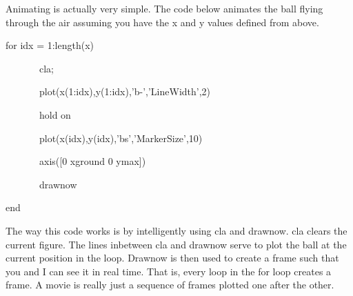 \begin{enumerate}
Animating is actually very simple. The code below animates the ball
flying through the air assuming you have the x and y values defined
from above.

\begin{framed}

for idx = 1:length(x)

~~~~~~~cla;

~~~~~~~plot(x(1:idx),y(1:idx),'b-','LineWidth',2)

~~~~~~~hold on

~~~~~~~plot(x(idx),y(idx),'bs','MarkerSize',10)

~~~~~~~axis([0 xground 0 ymax])

~~~~~~~drawnow

end

\end{framed}

The way this code works is by intelligently using cla and drawnow. cla
clears the current figure. The lines inbetween cla and drawnow serve
to plot the ball at the current position in the loop. Drawnow is then
used to create a frame such that you and I can see it in real
time. That is, every loop in the for loop creates a frame. A movie is
really just a sequence of frames plotted one after the other. 

\end{enumerate}
